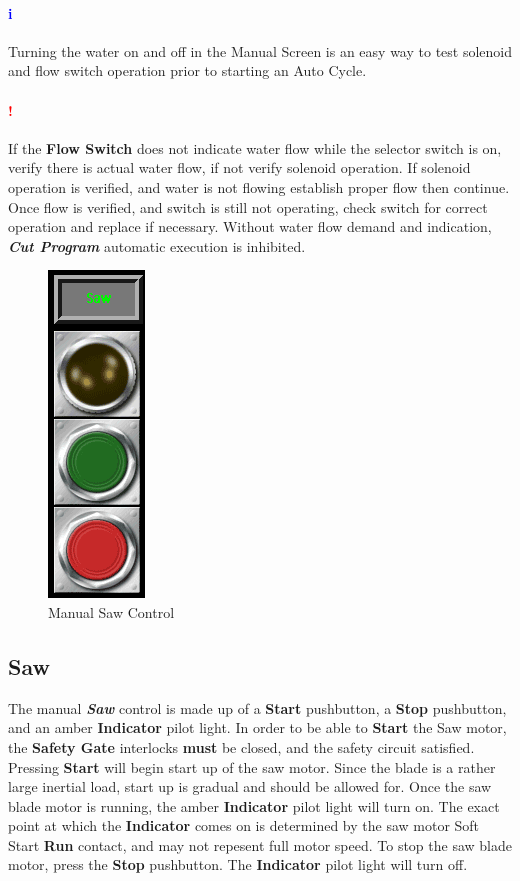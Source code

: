 \paragraph*{\textbf{\LARGE \textcolor{blue}{i}}}Turning the water on and off in the Manual Screen is an easy way to test solenoid and flow switch operation prior to starting an Auto Cycle.
\paragraph*{\textbf{{\LARGE \textcolor{red}{!}}}}If the \textbf{Flow Switch} does not indicate water flow while the selector switch is on, verify there is actual water flow, if not verify solenoid operation. If solenoid operation is verified, and water is not flowing establish proper flow then continue. Once flow is verified, and switch is still not operating, check switch for correct operation and replace if necessary. Without water flow demand and indication, \textbf{\textit{Cut Program}} automatic execution is inhibited.
\pagebreak
\nopagebreak
\begin{figure}
	\centering
	\includegraphics[width=.2\linewidth]{screen-captures/manual-saw}
	\caption{Manual Saw Control}
	\label{fig:manual-saw}
\end{figure}
\subsection{Saw}The manual \textbf{\textit{Saw}} control is made up of a \textbf{Start} pushbutton, a \textbf{Stop} pushbutton, and an amber \textbf{Indicator} pilot light. In order to be able to \textbf{Start} the Saw motor, the \textbf{Safety Gate} interlocks \textbf{must} be closed, and the safety circuit satisfied. Pressing \textbf{Start} will begin start up of the saw motor. Since the blade is a rather large inertial load, start up is gradual and should be allowed for. Once the saw blade motor is running, the amber \textbf{Indicator} pilot light will turn on. The exact point at which the \textbf{Indicator} comes on is determined by the saw motor Soft Start \textbf{Run} contact, and may not repesent full motor speed. To stop the saw blade motor, press the \textbf{Stop} pushbutton. The \textbf{Indicator} pilot light will turn off.
